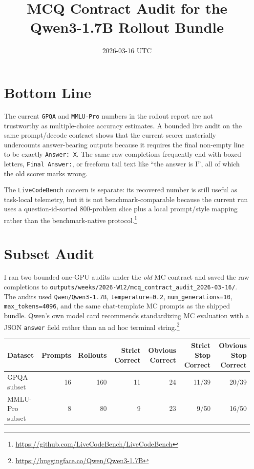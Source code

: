 \documentclass[11pt]{article}
\title{MCQ Contract Audit for the Qwen3-1.7B Rollout Bundle}
\date{2026-03-16 UTC}
\begin{document}
\maketitle

\section*{Bottom Line}
The current \texttt{GPQA} and \texttt{MMLU-Pro} numbers in the rollout report are
not trustworthy as multiple-choice accuracy estimates. A bounded live audit on the
same prompt/decode contract shows that the current scorer materially undercounts
answer-bearing outputs because it requires the final non-empty line to be exactly
\texttt{Answer: X}. The same raw completions frequently end with boxed letters,
\texttt{Final Answer:}, or freeform tail text like ``the answer is I'', all of which
the old scorer marks wrong.

The \texttt{LiveCodeBench} concern is separate: its recovered number is still useful as
task-local telemetry, but it is not benchmark-comparable because the current run uses
a question-id-sorted 800-problem slice plus a local prompt/style mapping rather than
the benchmark-native protocol.\footnote{\url{https://github.com/LiveCodeBench/LiveCodeBench}}

\section*{Subset Audit}
I ran two bounded one-GPU audits under the \emph{old} MC contract and saved the raw
completions to
\texttt{outputs/weeks/2026-W12/mcq\_contract\_audit\_2026-03-16/}. The audits used
\texttt{Qwen/Qwen3-1.7B}, \texttt{temperature=0.2}, \texttt{num\_generations=10},
\texttt{max\_tokens=4096}, and the same chat-template MC prompts as the shipped
bundle. Qwen's own model card recommends standardizing MC evaluation with a JSON
\texttt{answer} field rather than an ad hoc terminal string.\footnote{\url{https://huggingface.co/Qwen/Qwen3-1.7B}}

\begin{center}
\begin{tabular}{lrrrrrr}
\toprule
Dataset & Prompts & Rollouts & Strict Correct & Obvious Correct & Strict Stop Correct & Obvious Stop Correct \\
\midrule
GPQA subset & 16 & 160 & 11 & 24 & 11/39 & 20/39 \\
MMLU-Pro subset & 8 & 80 & 9 & 23 & 9/50 & 16/50 \\
\bottomrule
\end{tabular}
\end{center}
\end{document}
